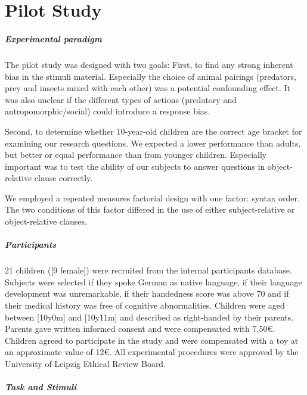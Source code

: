 \chapter{Pilot Study}\label{pilotstudy}

\paragraph{Experimental paradigm}

The pilot study was designed with two goals:
First, to find any strong inherent bias in the stimuli material.
Especially the choice of animal pairings (predators, prey and insects mixed with each other) was a potential confounding effect.
It was also unclear if the different types of actions (predatory and antropomorphic/social) could introduce a response bias.

Second, to determine whether 10-year-old children are the correct age bracket for examining our research questions.
We expected a lower performance than adults, but better or equal performance than from younger children.
Especially important was to test the ability of our subjects to answer questions in object-relative clause correctly.

We employed a repeated measures factorial design with one factor: syntax order.
The two conditions of this factor differed in the use of either subject-relative or object-relative clauses.

\paragraph{Participants}

21 children ([9 female]) were recruited from the internal participants database.
Subjects were selected if they spoke German as native language, if their language development was unremarkable, if their handedness score was above 70 and if their medical history was free of cognitive abnormalities.
Children were aged between [10y0m] and [10y11m] and described as right-handed by their parents.
Parents gave written informed consent and were compensated with 7,50\euro.
Children agreed to participate in the study and were compensated with a toy at an approximate value of 12\euro.
All experimental procedures were approved by the University of Leipzig Ethical Review Board.


\paragraph{Task and Stimuli}

